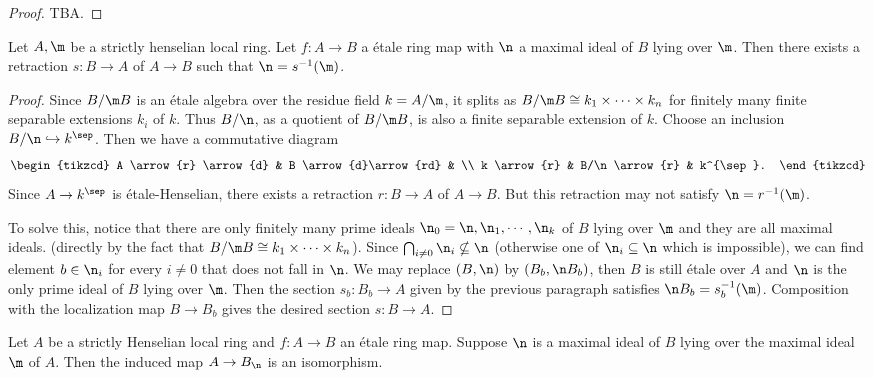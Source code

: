 \begin{proof}
    TBA.
\end{proof}

\begin{proposition}
    \label{thm:strictly-henselian-good-retraction}
    Let \(A, \m\) be a strictly henselian local ring. Let \(f : A \to B\) a \'etale ring map with \(\n\) a maximal ideal of \(B\) lying over \(\m\). Then there exists a retraction \(s : B \to A\) of \(A \to B\) such that \(\n = s^{-1}(\m)\).
\end{proposition}

\begin{proof}
  Since \(B/\m B\) is an étale algebra over the residue field \(k = A/\m\), it splits as \(B/\m B \cong k_1 \times \cdots \times k_n\) for finitely many finite separable extensions \(k_i\) of \(k\). Thus \(B/\n\), as a quotient of \(B/\m B\), is also a finite separable extension of \(k\). Choose an inclusion \(B/\n \hookrightarrow k^{\sep}\). Then we have a commutative diagram
  \[
  \begin{tikzcd}
    A \arrow{r} \arrow{d} & B \arrow{d}\arrow{rd} & \\
    k \arrow{r} & B/\n \arrow{r} & k^{\sep}.
  \end{tikzcd}
  \]
  Since \(A \to k^{\sep}\) is étale-Henselian, there exists a retraction \(r : B \to A\) of \(A \to B\). But this retraction may not satisfy \(\n = r^{-1}(\m)\). 
  
  To solve this, notice that there are only finitely many prime ideals \(\n_0 = \n, \n_1, \cdots, \n_k\) of \(B\) lying over \(\m\) and they are all maximal ideals. (directly by the fact that \(B/\m B \cong k_1 \times \cdots \times k_n\)). Since \(\bigcap_{i \ne 0} \n_i \nsubseteq \n\) (otherwise one of \(\n_i \subseteq \n\) which is impossible), we can find element \(b \in \n_i\) for every \(i \ne 0\) that does not fall in $\n$. We may replace \((B, \n)\) by \((B_b, \n B_b)\), then \(B\) is still étale over \(A\) and \(\n\) is the only prime ideal of \(B\) lying over \(\m\). Then the section \(s_b : B_b \to A\) given by the previous paragraph satisfies \(\n B_b = s_b^{-1}(\m)\). Composition with the localization map \(B \to B_b\) gives the desired section \(s : B \to A\).
\end{proof}

\begin{proposition}
    \label{thm:etale-over-strictly-henselian-localization-isom}
    Let \(A\) be a strictly Henselian local ring and \(f : A \to B\) an étale ring map. Suppose \(\n\) is a maximal ideal of \(B\) lying over the maximal ideal \(\m\) of \(A\). Then the induced map \(A \to B_\n\) is an isomorphism.
\end{proposition}

